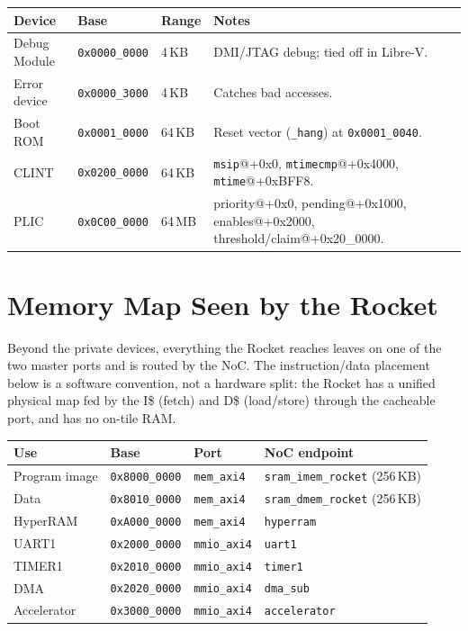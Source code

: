 \begin{longtable}{@{}llll@{}}
\toprule
\textbf{Device} & \textbf{Base} & \textbf{Range} & \textbf{Notes} \\
\midrule
\endhead
Debug Module & \texttt{0x0000\_0000} & 4\,KB & DMI/JTAG debug; tied off in Libre-V. \\
Error device & \texttt{0x0000\_3000} & 4\,KB & Catches bad accesses. \\
Boot ROM     & \texttt{0x0001\_0000} & 64\,KB & Reset vector (\texttt{\_hang}) at \texttt{0x0001\_0040}. \\
CLINT        & \texttt{0x0200\_0000} & 64\,KB & \texttt{msip}@+0x0, \texttt{mtimecmp}@+0x4000, \texttt{mtime}@+0xBFF8. \\
PLIC         & \texttt{0x0C00\_0000} & 64\,MB & priority@+0x0, pending@+0x1000, enables@+0x2000, threshold/claim@+0x20\_0000. \\
\bottomrule
\end{longtable}

\section{Memory Map Seen by the Rocket}
Beyond the private devices, everything the Rocket reaches leaves on one of the two master ports and is
routed by the NoC. The instruction/data placement below is a software convention, not a hardware split:
the Rocket has a unified physical map fed by the I\$ (fetch) and D\$ (load/store) through the cacheable
port, and has no on-tile RAM.

\begin{tabular}{@{}llll@{}}
\toprule
\textbf{Use} & \textbf{Base} & \textbf{Port} & \textbf{NoC endpoint} \\
\midrule
Program image  & \texttt{0x8000\_0000} & \texttt{mem\_axi4}  & \texttt{sram\_imem\_rocket} (256\,KB) \\
Data           & \texttt{0x8010\_0000} & \texttt{mem\_axi4}  & \texttt{sram\_dmem\_rocket} (256\,KB) \\
HyperRAM       & \texttt{0xA000\_0000} & \texttt{mem\_axi4}  & \texttt{hyperram} \\
UART1          & \texttt{0x2000\_0000} & \texttt{mmio\_axi4} & \texttt{uart1} \\
TIMER1         & \texttt{0x2010\_0000} & \texttt{mmio\_axi4} & \texttt{timer1} \\
DMA            & \texttt{0x2020\_0000} & \texttt{mmio\_axi4} & \texttt{dma\_sub} \\
Accelerator    & \texttt{0x3000\_0000} & \texttt{mmio\_axi4} & \texttt{accelerator} \\
\bottomrule
\end{tabular}

